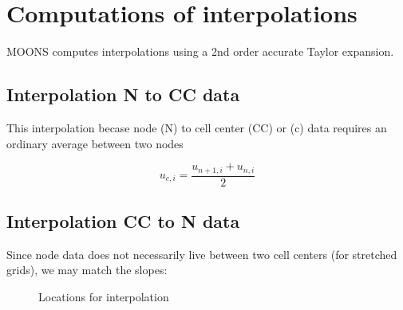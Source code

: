 \documentclass[11pt]{article}
\newcommand{\height}{0.4}
\newcommand{\radius}{0.1}
\newcommand{\offSet}{12}
\newcommand{\Deltah}{3}
\begin{document}
\doublespacing
\MOONSTITLE
\maketitle

\section{Computations of interpolations}
MOONS computes interpolations using a 2nd order accurate Taylor expansion.

\subsection{Interpolation N to CC data}
This interpolation becase node (N) to cell center (CC) or (c) data requires an ordinary average between two nodes

\begin{equation}
	u_{c,i} = \frac{u_{n+1,i}+u_{n,i}}{2}
\end{equation}

\subsection{Interpolation CC to N data}
Since node data does not necessarily live between two cell centers (for stretched grids), we may match the slopes:

\begin{figure}[H]
  \begin{center}
    \caption{Locations for interpolation}
  \end{center}
\end{figure}
\end{document}
